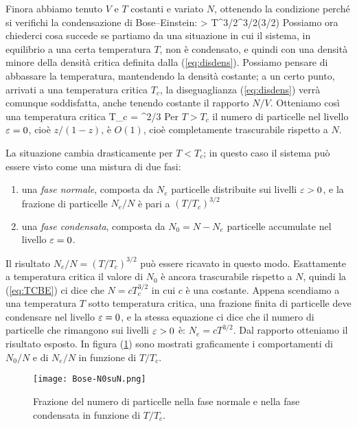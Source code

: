 Finora abbiamo tenuto $V$ e $T$ costanti e variato $N$, ottenendo la condizione perché si verifichi la condensazione di Bose--Einstein:
\be
\label{eq:disdens}
 > T^{3/2}^{3/2}\zeta(3/2)
\ee
Possiamo ora chiederci cosa succede se partiamo da una situazione in cui il sistema, in equilibrio a una certa temperatura $T$, non è condensato, e quindi con una densità minore della densità critica definita dalla (\ref{eq:disdens}). Possiamo pensare di abbassare la temperatura, mantendendo la densità costante; a un certo punto, arrivati a una temperatura critica $T_c$, la diseguaglianza (\ref{eq:disdens}) verrà comunque soddisfatta, anche tenendo costante il rapporto $N/V$. Otteniamo così una temperatura critica
\be
\label{eq:TCBE}
T_c = ^{2/3}
\ee
Per $T > T_c$ il numero di particelle nel livello $\varepsilon = 0$, cioè $z/(1-z)$, è $O(1)$, cioè completamente trascurabile rispetto a $N$.

La situazione cambia drasticamente per $T < T_c$; in questo caso il sistema può essere visto come una mistura di due fasi:
\begin{enumerate}
\item una {\em fase normale}, composta da $N_e$ particelle distribuite sui livelli $\varepsilon > 0$, e la frazione di particelle $N_e/N$ è pari a $(T/T_c)^{3/2}$
\item una {\em fase condensata}, composta da $N_0 = N-N_e$ particelle accumulate nel livello $\varepsilon = 0$.
\end{enumerate}
Il risultato $N_e/N = (T/T_c)^{3/2}$ può essere ricavato in questo modo. Esattamente a temperatura critica il valore di $N_0$ è ancora trascurabile rispetto a $N$, quindi la (\ref{eq:TCBE}) ci dice che $N = cT_c^{3/2}$ in cui $c$ è una costante. Appena scendiamo a una temperatura $T$ sotto temperatura critica, una frazione finita di particelle deve condensare nel livello $\varepsilon=0$, e la stessa equazione ci dice che il numero di particelle che rimangono sui livelli $\varepsilon>0$ è: $N_e = cT^{3/2}$. Dal rapporto otteniamo il risultato esposto. In figura (\ref{fig:n0sun}) sono mostrati graficamente i comportamenti di $N_0/N$ e di $N_e/N$ in funzione di $T/T_c$.
\begin{figure}[!ht]
	\centering
	\texttt{[image: Bose-N0suN.png]}
	\caption{Frazione del numero di particelle nella fase normale e nella fase condensata in funzione di $T/T_c$.}
	\label{fig:n0sun}
\end{figure}

